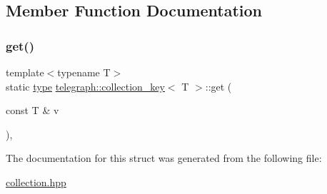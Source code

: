 \subsection{Member Function Documentation}
\mbox{\label{structtelegraph_1_1collection__key_a997f4a2971254f1ba4eebb900ce9d25c}} 
\subsubsection{\texorpdfstring{get()}{get()}}
{\footnotesize\ttfamily template$<$typename T$>$ \\
static \hyperlink{structtelegraph_1_1collection__key_a8f170ae277cbff0e224232c6f909a945}{type} \hyperlink{structtelegraph_1_1collection__key}{telegraph\+::collection\+\_\+key}$<$ T $>$\+::get (\begin{DoxyParamCaption}\item[{const T \&}]{v }\end{DoxyParamCaption})\hspace{0.3cm}{\ttfamily [inline]}, {\ttfamily [static]}}



The documentation for this struct was generated from the following file\+:\begin{DoxyCompactItemize}
\item 
\hyperlink{collection_8hpp}{collection.\+hpp}\end{DoxyCompactItemize}
